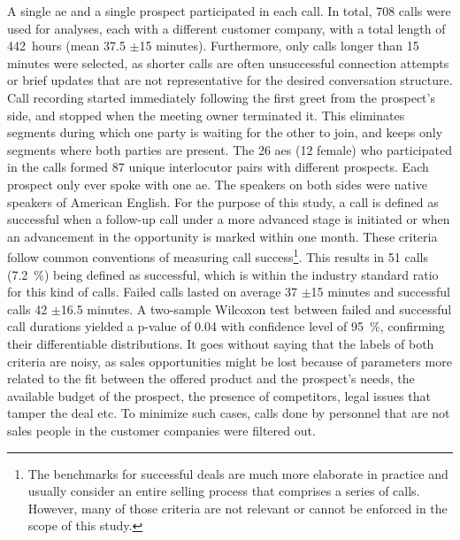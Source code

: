 A single \ac{ae} and a single prospect participated in each call.
In total, 708 calls were used for analyses, each with a different customer company, with a total length of \SI{442}{hours} (mean 37.5 $\pm$15 minutes).
Furthermore, only calls longer than 15 minutes were selected, as shorter calls are often unsuccessful connection attempts or brief updates that are not representative for the desired conversation structure.
Call recording started immediately following the first greet from the prospect's side, and stopped when the meeting owner terminated it.
This eliminates segments during which one party is waiting for the other to join, and keeps only segments where both parties are present.
The 26 \acp{ae} (12 female) who participated in the calls formed 87 unique interlocutor pairs with different prospects.
Each prospect only ever spoke with one \ac{ae}.
The speakers on both sides were native speakers of American English.
For the purpose of this study, a call is defined as successful when a follow-up call under a more advanced stage is initiated or when an advancement in the opportunity is marked within one month.
These criteria follow common conventions of measuring call success\footnote{The benchmarks for successful deals are much more elaborate in practice and usually consider an entire selling process that comprises a series of calls. However, many of those criteria are not relevant or cannot be enforced in the scope of this study.}.
This results in 51 calls (\SI{7.2}{\percent}) being defined as successful, which is within the industry standard ratio for this kind of calls.
Failed calls lasted on average 37 $\pm$15 minutes and successful calls 42 $\pm$16.5 minutes.
A two-sample Wilcoxon test \citep{Wilcoxon1945individual} between failed and successful call durations yielded a p-value of 0.04 with confidence level of \SI{95}{\percent}, confirming their differentiable distributions.
It goes without saying that the labels of both criteria are noisy, as sales opportunities might be lost because of parameters more related to the fit between the offered product and the prospect's needs, the available budget of the prospect, the presence of competitors, legal issues that tamper the deal etc.
To minimize such cases, calls done by personnel that are not sales people in the customer companies were filtered out.

